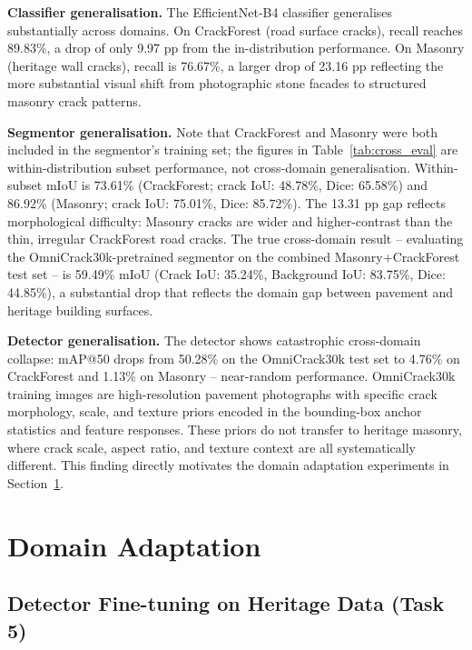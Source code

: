 \documentclass[12pt,a4paper]{article}
\begin{document}
\textbf{Classifier generalisation.} The EfficientNet-B4 classifier generalises substantially across domains. On CrackForest (road surface cracks), recall reaches 89.83\%, a drop of only 9.97 pp from the in-distribution performance. On Masonry (heritage wall cracks), recall is 76.67\%, a larger drop of 23.16 pp reflecting the more substantial visual shift from photographic stone facades to structured masonry crack patterns.

\textbf{Segmentor generalisation.} Note that CrackForest and Masonry were both included in the segmentor's training set; the figures in Table~\ref{tab:cross_eval} are within-distribution subset performance, not cross-domain generalisation. Within-subset mIoU is 73.61\% (CrackForest; crack IoU: 48.78\%, Dice: 65.58\%) and 86.92\% (Masonry; crack IoU: 75.01\%, Dice: 85.72\%). The 13.31 pp gap reflects morphological difficulty: Masonry cracks are wider and higher-contrast than the thin, irregular CrackForest road cracks. The true cross-domain result -- evaluating the OmniCrack30k-pretrained segmentor on the combined Masonry+CrackForest test set -- is 59.49\% mIoU (Crack IoU: 35.24\%, Background IoU: 83.75\%, Dice: 44.85\%), a substantial drop that reflects the domain gap between pavement and heritage building surfaces.

\textbf{Detector generalisation.} The detector shows catastrophic cross-domain collapse: mAP@50 drops from 50.28\% on the OmniCrack30k test set to 4.76\% on CrackForest and 1.13\% on Masonry -- near-random performance. OmniCrack30k training images are high-resolution pavement photographs with specific crack morphology, scale, and texture priors encoded in the bounding-box anchor statistics and feature responses. These priors do not transfer to heritage masonry, where crack scale, aspect ratio, and texture context are all systematically different. This finding directly motivates the domain adaptation experiments in Section~\ref{sec:domain_adapt}.

\clearpage
\section{Domain Adaptation}
\label{sec:domain_adapt}

\subsection{Detector Fine-tuning on Heritage Data (Task 5)}
\end{document}
